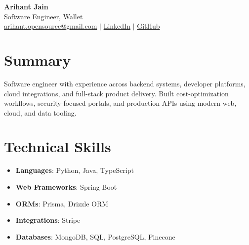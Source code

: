 \documentclass[11pt,a4paper]{article}
\begin{document}
\begin{center}
{\LARGE \textbf{Arihant Jain}}
\\ Software Engineer, Wallet
\\ \href{mailto:arihant.opensource@gmail.com}{arihant.opensource@gmail.com} $\mid$ \href{https://linkedin.com/in/arihantjain1208}{LinkedIn} $\mid$ \href{https://github.com/Arihant1208}{GitHub}
\end{center}

\section{Summary}
Software engineer with experience across backend systems, developer platforms, cloud integrations, and full-stack product delivery. Built cost-optimization workflows, security-focused portals, and production APIs using modern web, cloud, and data tooling.

\section{Technical Skills}
\begin{itemize}
  \item \textbf{Languages}: Python, Java, TypeScript
  \item \textbf{Web Frameworks}: Spring Boot
  \item \textbf{ORMs}: Prisma, Drizzle ORM
  \item \textbf{Integrations}: Stripe
  \item \textbf{Databases}: MongoDB, SQL, PostgreSQL, Pinecone
\end{itemize}
\end{document}
